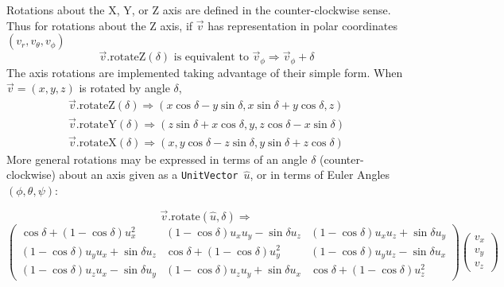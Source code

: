 \documentclass[twoside,12pt]{article}
\def \UV {{\tt UnitVector}}
\begin{document}
\noindent
Rotations about the X, Y, or Z axis are defined in the counter-clockwise
sense.  Thus for rotations about the Z axis, if $\vec{v}$ has representation
in polar coordinates $( v_r, v_\theta, v_\phi )$
\begin{equation}
  \vec{v}.\mbox{rotateZ} ( \delta ) \mbox{ is equivalent to }
  \vec{v}_\phi \Longrightarrow \vec{v}_\phi + \delta
    \label{eq:rotZ:2}
\end{equation}
\noindent
The axis rotations are implemented taking advantage of their
simple form.  When $\vec{v} = (x, y, z)$ is rotated by angle $\delta$,
\begin{eqnarray}
  \vec{v}.\mbox{rotateZ} (\delta) \Longrightarrow
    ( x \cos\delta - y \sin\delta, x \sin\delta + y \cos\delta, z )
    \label{eq:rotZ} \\
  \vec{v}.\mbox{rotateY} (\delta) \Longrightarrow
    ( z \sin\delta + x \cos\delta, y, z \cos\delta - x \sin\delta )
    \label{eq:rotY} \\
  \vec{v}.\mbox{rotateX} (\delta) \Longrightarrow
    ( x, y \cos\delta - z \sin\delta, y \sin\delta + z \cos\delta )
    \label{eq:rotX}
\end{eqnarray}
\noindent
More general rotations may be expressed in terms of
an angle $\delta$ (counter-clockwise) about an axis given
as a \UV\ $\hat{u}$, or in terms of Euler Angles
$(\phi, \theta, \psi)$:

\[  \vec{v}.\mbox{rotate}(\hat{u},\delta) \Longrightarrow \]
\begin{equation}
\label{eq:axisrot}
\left(
\begin{array}{ccc}
\cos \delta + (1 - \cos \delta ) u_x^2 &
(1 - \cos \delta ) u_x u_y - \sin \delta u_z &
(1 - \cos \delta ) u_x u_z + \sin \delta u_y \\
(1 - \cos \delta ) u_y u_x + \sin \delta u_z &
\cos \delta + (1 - \cos \delta ) u_y^2 &
(1 - \cos \delta ) u_y u_z - \sin \delta u_x \\
(1 - \cos \delta ) u_z u_x - \sin \delta u_y &
(1 - \cos \delta ) u_z u_y + \sin \delta u_x &
\cos \delta + (1 - \cos \delta ) u_z^2
\end{array}
\right)
\left(
\begin{array}{c}
v_x\\
v_y\\
v_z
\end{array}
\right)
\end{equation}
\end{document}
